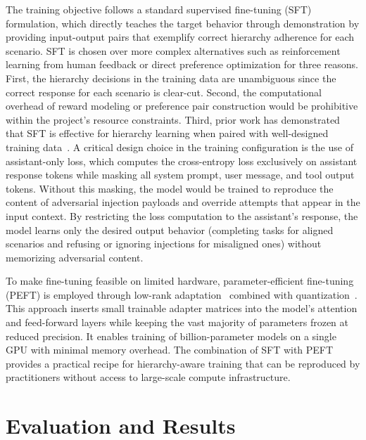 \documentclass[sigconf]{acmart}
\begin{document}
The training objective follows a standard supervised fine-tuning (SFT) formulation, which directly teaches the target behavior through demonstration by providing input-output pairs that exemplify correct hierarchy adherence for each scenario. SFT is chosen over more complex alternatives such as reinforcement learning from human feedback or direct preference optimization for three reasons. First, the hierarchy decisions in the training data are unambiguous since the correct response for each scenario is clear-cut. Second, the computational overhead of reward modeling or preference pair construction would be prohibitive within the project's resource constraints. Third, prior work has demonstrated that SFT is effective for hierarchy learning when paired with well-designed training data~\cite{wallace2024instructionhierarchytrainingllms}. A critical design choice in the training configuration is the use of assistant-only loss, which computes the cross-entropy loss exclusively on assistant response tokens while masking all system prompt, user message, and tool output tokens. Without this masking, the model would be trained to reproduce the content of adversarial injection payloads and override attempts that appear in the input context. By restricting the loss computation to the assistant's response, the model learns only the desired output behavior (completing tasks for aligned scenarios and refusing or ignoring injections for misaligned ones) without memorizing adversarial content.

To make fine-tuning feasible on limited hardware, parameter-efficient fine-tuning (PEFT) is employed through low-rank adaptation~\cite{hu2022lora} combined with quantization~\cite{dettmers2023qlora}. This approach inserts small trainable adapter matrices into the model's attention and feed-forward layers while keeping the vast majority of parameters frozen at reduced precision. It enables training of billion-parameter models on a single GPU with minimal memory overhead. The combination of SFT with PEFT provides a practical recipe for hierarchy-aware training that can be reproduced by practitioners without access to large-scale compute infrastructure.


\section{Evaluation and Results}
\end{document}
